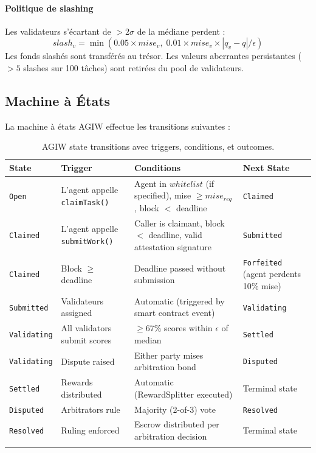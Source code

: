 \documentclass[11pt]{article}
\begin{document}
\paragraph{Politique de slashing} Les validateurs s'écartant de $>2\sigma$ de la médiane perdent :
\begin{equation}
slash_v = \min(0.05 \times mise_v, \; 0.01 \times mise_v \times |q_v - q| / \epsilon)
\end{equation}
Les fonds slashés sont transférés au trésor. Les valeurs aberrantes persistantes ($>5$ slashes sur 100 tâches) sont retirées du pool de validateurs.

\subsection{Machine à États}
\label{sec:agiw-state-machine}
La machine à états AGIW effectue les transitions suivantes :
\begin{longtable}{@{}p{}p{}p{}p{}@{}}
\toprule
\textbf{State} & \textbf{Trigger} & \textbf{Conditions} & \textbf{Next State} \\\midrule
\texttt{Open} & L'agent appelle \texttt{claimTask()} & Agent in $whitelist$ (if specified), mise $\geq mise_{req}$, block $<$ deadline & \texttt{Claimed} \\
\texttt{Claimed} & L'agent appelle \texttt{submitWork()} & Caller is claimant, block $<$ deadline, valid attestation signature & \texttt{Submitted} \\
\texttt{Claimed} & Block $\geq$ deadline & Deadline passed without submission & \texttt{Forfeited} (agent perdents 10\% mise) \\
\texttt{Submitted} & Validateurs assigned & Automatic (triggered by smart contract event) & \texttt{Validating} \\
\texttt{Validating} & All validators submit scores & $\geq 67\%$ scores within $\epsilon$ of median & \texttt{Settled} \\
\texttt{Validating} & Dispute raised & Either party mises arbitration bond & \texttt{Disputed} \\
\texttt{Settled} & Rewards distributed & Automatic (RewardSplitter executed) & Terminal state \\
\texttt{Disputed} & Arbitrators rule & Majority (2-of-3) vote & \texttt{Resolved} \\
\texttt{Resolved} & Ruling enforced & Escrow distributed per arbitration decision & Terminal state \\\bottomrule
\caption{AGIW state transitions avec triggers, conditions, et outcomes.}
\label{tab:agiw-states}
\end{longtable}
\end{document}
